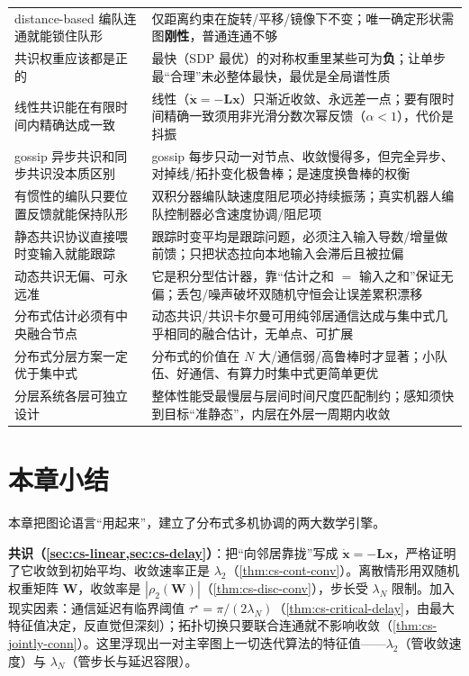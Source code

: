 \begin{table}[H]
\begin{tabular}{p{6.0cm}p{8.2cm}}
distance-based 编队连通就能锁住队形 & 仅距离约束在旋转/平移/镜像下不变；唯一确定形状需图\textbf{刚性}，普通连通不够 \\
共识权重应该都是正的 & 最快（SDP 最优）的对称权重里某些可为\textbf{负}；让单步最“合理”未必整体最快，最优是全局谱性质 \\
线性共识能在有限时间内精确达成一致 & 线性（$\dot{\mathbf{x}}=-\mathbf{L}\mathbf{x}$）只渐近收敛、永远差一点；要有限时间精确一致须用非光滑分数次幂反馈（$\alpha<1$），代价是抖振 \\
gossip 异步共识和同步共识没本质区别 & gossip 每步只动一对节点、收敛慢得多，但完全异步、对掉线/拓扑变化极鲁棒；是速度换鲁棒的权衡 \\
有惯性的编队只要位置反馈就能保持队形 & 双积分器编队缺速度阻尼项必持续振荡；真实机器人编队控制器必含速度协调/阻尼项 \\
静态共识协议直接喂时变输入就能跟踪 & 跟踪时变平均是跟踪问题，必须注入输入导数/增量做前馈；只把状态拉向本地输入会滞后且被拉偏 \\
动态共识无偏、可永远准 & 它是积分型估计器，靠“估计之和 $=$ 输入之和”保证无偏；丢包/噪声破坏双随机守恒会让误差累积漂移 \\
分布式估计必须有中央融合节点 & 动态共识/共识卡尔曼可用纯邻居通信达成与集中式几乎相同的融合估计，无单点、可扩展 \\
分布式分层方案一定优于集中式 & 分布式的价值在 $N$ 大/通信弱/高鲁棒时才显著；小队伍、好通信、有算力时集中式更简单更优 \\
分层系统各层可独立设计 & 整体性能受最慢层与层间时间尺度匹配制约；感知须快到目标“准静态”，内层在外层一周期内收敛 \\
\bottomrule
\end{tabular}
\end{table}

\section*{本章小结}

本章把图论语言“用起来”，建立了分布式多机协调的两大数学引擎。

\textbf{共识（\cref{sec:cs-linear,sec:cs-delay}）}：把“向邻居靠拢”写成 $\dot{\mathbf{x}}=-\mathbf{L}\mathbf{x}$，严格证明了它收敛到初始平均、收敛速率正是 $\lambda_2$（\cref{thm:cs-cont-conv}）。离散情形用双随机权重矩阵 $\mathbf{W}$，收敛率是 $|\rho_2(\mathbf{W})|$（\cref{thm:cs-disc-conv}），步长受 $\lambda_N$ 限制。加入现实因素：通信延迟有临界阈值 $\tau^\star=\pi/(2\lambda_N)$（\cref{thm:cs-critical-delay}，由最大特征值决定，反直觉但深刻）；拓扑切换只要联合连通就不影响收敛（\cref{thm:cs-jointly-conn}）。这里浮现出一对主宰图上一切迭代算法的特征值——$\lambda_2$（管收敛速度）与 $\lambda_N$（管步长与延迟容限）。

